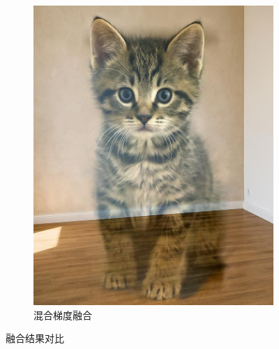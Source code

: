 \documentclass[11pt,a4paper]{article}
\begin{document}
\begin{figure}[ht]
\begin{subfigure}[htbp]{0.45\textwidth}
				\includegraphics[width=\textwidth]{../../result/result_31.jpg}
				\caption{混合梯度融合}
			\end{subfigure}
			\caption{融合结果对比}
		\end{figure}
\end{document}
